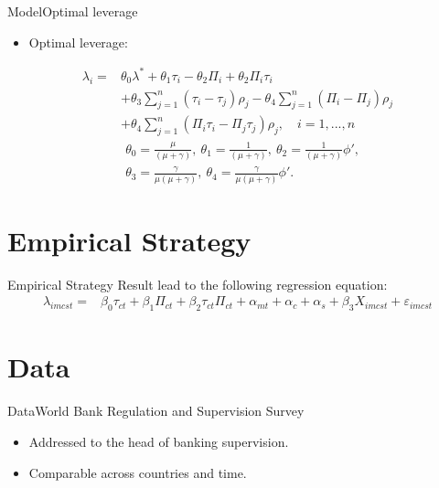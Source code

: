 \documentclass{beamer}
\begin{document}
\begin{frame}{Model}{Optimal leverage}
\begin{itemize}
	\item  Optimal leverage:
\end{itemize}
\begin{equation}
\begin{aligned}
\lambda_i = &\theta_0\lambda^*+\theta_1\tau_i-\theta_2\Pi_i+\theta_2\Pi_i\tau_{i}\\
&+\theta_3\sum_{j=1}^{n}(\tau_i-\tau_j)\rho_j-\theta_4\sum_{j=1}^{n}(\Pi_i-\Pi_j)\rho_j\\
&+\theta_4\sum_{j=1}^{n}(\Pi_i\tau_i-\Pi_j\tau_j)\rho_j, \quad i=1,...,n
\end{aligned}
\label{eq:optimal leverage in theory}
\end{equation}
\begin{equation*}
\begin{aligned}
&\theta_0=\frac{\mu}{(\mu+\gamma)}, \ \theta_1=\frac{1}{(\mu+\gamma)}, \
\theta_2=\frac{1}{(\mu+\gamma)}\phi', \\
&\theta_3=\frac{\gamma}{\mu(\mu+\gamma)}, \
\theta_4=\frac{\gamma}{\mu(\mu+\gamma)}\phi'.
\end{aligned}
\end{equation*}
\end{frame}




\section{Empirical Strategy}
\begin{frame}{Empirical Strategy}
Result lead to the following regression equation:
\begin{equation}
\begin{aligned}
\lambda_{imcst}=&\beta_0\tau_{ct}+\beta_1\Pi_{ct}+\beta_2\tau_{ct}\Pi_{ct}+\alpha_{mt}+\alpha_{c}+\alpha_{s}+\beta_3X_{imcst}+\varepsilon_{imcst}
\label{eq:optimal leverage empirically 1}
\end{aligned}
\end{equation}

\end{frame}

\section{Data}

\begin{frame}{Data}{World Bank Regulation
	and Supervision Survey \citep{barth2013bank}}

\begin{itemize}
	\item Addressed to the head of banking supervision.
	\vspace{\baselineskip}
	\item Comparable across countries and time.

	
\end{itemize}
	

\end{frame}
\end{document}
